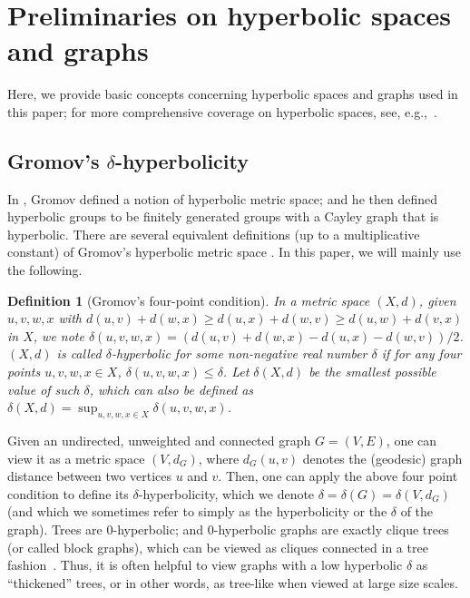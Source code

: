 \documentclass[11pt]{article}
\newtheorem{defi}{Definition}
\begin{document}
\section{Preliminaries on hyperbolic spaces and graphs} \label{sec:pre}

Here, we provide basic concepts concerning hyperbolic spaces and graphs used 
in this paper; for more comprehensive coverage on hyperbolic spaces, see, 
e.g.,~\cite{BH99}.


\subsection{Gromov's $\delta$-hyperbolicity}

In \cite{gromov1987hyperbolic}, Gromov defined a notion of hyperbolic metric 
space; and he then defined hyperbolic groups to be finitely generated groups 
with a Cayley graph that is hyperbolic. 
There are several equivalent definitions (up to a multiplicative constant) 
of Gromov's hyperbolic metric space \cite{bowditch1991notes}. 
In this paper, we will mainly use the following. 

\begin{defi}[Gromov's four-point condition]
In a metric space $(X,d)$, given $u,v,w,x$ with $d(u,v)+d(w,x) \geq 
	d(u,x)+d(w,v) \geq d(u,w)+d(v,x)$ in $X$, 
	we note $\delta(u,v,w,x)=(d(u,v)+d(w,x)-d(u,x)-d(w,v))/2$. 
$(X,d)$ is called \emph{$\delta$-hyperbolic} for some non-negative 
	real number $\delta$ if for any four points 
	$u,v,w,x \in X$, $\delta(u,v,w,x) \leq \delta$. 
Let $\delta(X,d)$ be the smallest possible value of such $\delta$, which
	can also be defined as $\delta(X,d) = \sup_{u,v,w,x \in X} \delta(u,v,w,x)$.
\end{defi}

Given an undirected, unweighted and connected graph $G=(V,E)$, one can view 
it as a metric space $(V, d_G)$, where $d_G(u,v)$ denotes the (geodesic) 
graph distance between two vertices $u$ and $v$.
Then, one can apply the above four point condition to define its 
$\delta$-hyperbolicity, which we denote $\delta = \delta(G) = \delta(V,d_G)$ 
(and which we sometimes refer to simply as the hyperbolicity or the $\delta$ 
of the graph).
Trees are $0$-hyperbolic; and $0$-hyperbolic graphs are exactly clique trees 
(or called block graphs), which can be viewed as cliques connected in a tree 
fashion~\cite{Ho79}.
Thus, it is often helpful to view graphs with a low hyperbolic $\delta$ as 
``thickened'' trees, or in other words, as tree-like when viewed at large 
size scales.
\end{document}

